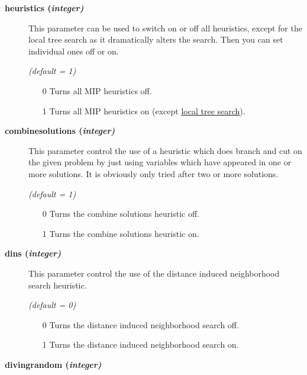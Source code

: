 \begin{description}

\item[\label{heuristics}\hypertarget{heuristics}
{\textbf{heuristics (\slshape{integer})}}]\hspace{1.0in}

This parameter can be used to switch on or off all heuristics, except for the local tree search as it dramatically alters the search.
Then you can set individual ones off or on.

\textsl{(default = 1)}
\begin{itemize}
\item[0] 
Turns all MIP heuristics off.
\item[1] 
Turns all MIP heuristics on (except \hyperlink{localtreesearch}{local tree search}).
\end{itemize}

\item[\label{combinesolutions}\hypertarget{combinesolutions}
{\textbf{combinesolutions (\slshape{integer})}}]\hspace{1.0in}

This parameter control the use of a heuristic which does branch and cut on the given problem by just using variables which have appeared in one or more solutions.
It is obviously only tried after two or more solutions.

\textsl{(default = 1)}
\begin{itemize}
\item[0] 
Turns the combine solutions heuristic off.
\item[1] 
Turns the combine solutions heuristic on.
\end{itemize}

\item[\label{dins}\hypertarget{dins}
{\textbf{dins (\slshape{integer})}}]\hspace{1.0in}

This parameter control the use of the distance induced neighborhood search heuristic.

\textsl{(default = 0)}
\begin{itemize}
\item[0] 
Turns the distance induced neighborhood search off.
\item[1] 
Turns the distance induced neighborhood search on.
\end{itemize}

\item[\label{divingrandom}\hypertarget{divingrandom}
{\textbf{divingrandom (\slshape{integer})}}]\hspace{1.0in}


\end{description}
